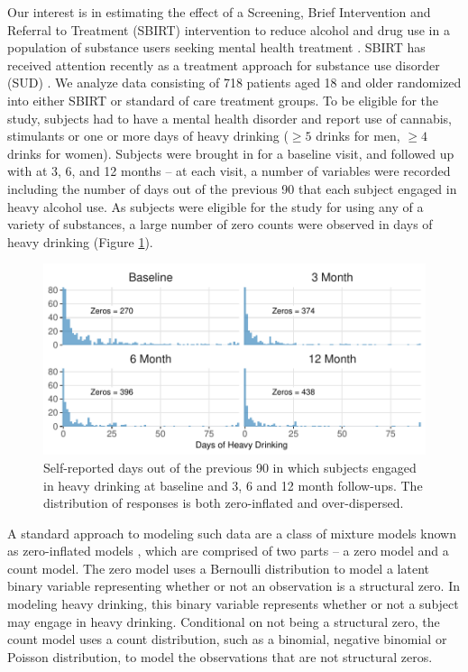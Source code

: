 \documentclass[12pt]{article}
\begin{document}
Our interest is in estimating the effect of a Screening, Brief Intervention and Referral to Treatment (SBIRT) intervention to reduce alcohol and drug use in a population of substance users seeking mental health treatment \citep{karno2021effect}. SBIRT has received attention recently as a treatment approach for substance use disorder (SUD) \citep{saitz2014screening, glass2015specialty, barata2017effectiveness, tetrault2020computerized}. We analyze data consisting of 718 patients aged 18 and older randomized into either SBIRT or standard of care treatment groups. To be eligible for the study, subjects had to have a mental health disorder and report use of cannabis, stimulants or one or more days of heavy drinking ($\geq 5$ drinks for men, $\geq 4$ drinks for women). Subjects were brought in for a baseline visit, and followed up with at 3, 6, and 12 months -- at each visit, a number of variables were recorded including the number of days out of the previous 90 that each subject engaged in heavy alcohol use. As subjects were eligible for the study for using any of a variety of substances, a large number of zero counts were observed in days of heavy drinking (Figure \ref{fig:inflation}).

\begin{figure}[ht]
	\centering
	\includegraphics[scale=1]{figures/inflation_heavy_plot.pdf}
	\caption{Self-reported days out of the previous 90 in which subjects engaged in heavy drinking at baseline and 3, 6 and 12 month follow-ups. The distribution of responses is both zero-inflated and over-dispersed.}
	\label{fig:inflation}
\end{figure}

A standard approach to modeling such data are a class of mixture models known as zero-inflated models \citep{cohen1966note, johnson2005univariate, ridout1998models}, which are comprised of two parts -- a zero model and a count model. The zero model uses a Bernoulli distribution to model a latent binary variable representing whether or not an observation is a structural zero. In modeling heavy drinking, this binary variable represents whether or not a subject may engage in heavy drinking. Conditional on not being a structural zero, the count model uses a count distribution, such as a binomial, negative binomial or Poisson distribution, to model the observations that are not structural zeros. 
\end{document}
